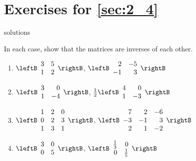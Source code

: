 \section*{Exercises for \ref{sec:2_4}}

\begin{Filesave}{solutions}
\end{Filesave}

\begin{multicols}{2}
\begin{ex}
In each case, show that the matrices are inverses of each other.

\begin{enumerate}[label={\alph*.}]
\item $\leftB \begin{array}{rr}
3 & 5 \\
1 & 2
\end{array} \rightB$, $\leftB \begin{array}{rr}
2 & -5 \\
-1 & 3
\end{array} \rightB$

\item $\leftB \begin{array}{rr}
3 & 0 \\
1 & -4
\end{array} \rightB$, $\frac{1}{2}\leftB \begin{array}{rr}
4 & 0 \\
1 & -3
\end{array} \rightB$

\item $\leftB \begin{array}{rrr}
1 & 2 & 0 \\
0 & 2 & 3 \\
1 & 3 & 1
\end{array} \rightB$, $\leftB \begin{array}{rrr}
7 & 2 & -6 \\
-3 & -1 & 3 \\
2 & 1 & -2
\end{array} \rightB$

\item $\leftB \begin{array}{rr}
3 & 0 \\
0 & 5
\end{array} \rightB$, $\leftB \begin{array}{rr}
\frac{1}{3} & 0 \\
0 & \frac{1}{5}
\end{array} \rightB$



\end{enumerate}
\end{ex}
\end{multicols}

